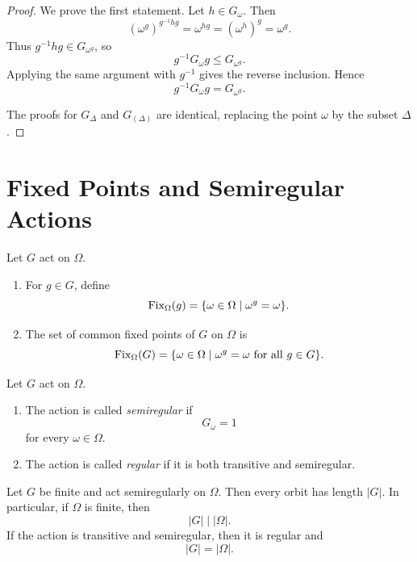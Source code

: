 \begin{proof}
We prove the first statement. Let \(h\in G_\omega\). Then
\[
    (\omega^g)^{g^{-1}hg}
    =
    \omega^{hg}
    =
    (\omega^h)^g
    =
    \omega^g.
\]
Thus \(g^{-1}hg\in G_{\omega^g}\), so
\[
    g^{-1}G_\omega g\leq G_{\omega^g}.
\]
Applying the same argument with \(g^{-1}\) gives the reverse inclusion. Hence
\[
    g^{-1}G_\omega g=G_{\omega^g}.
\]

The proofs for \(G_\Delta\) and \(G_{(\Delta)}\) are identical, replacing the point \(\omega\) by the subset \(\Delta\).
\end{proof}

\section{Fixed Points and Semiregular Actions}

\begin{definition}
Let \(G\) act on \(\Omega\).

\begin{enumerate}[label=\textup{(\arabic*)}]
    \item For \(g\in G\), define
    \[
        \operatorname{Fix}_\Omega(g)=\{\omega\in\Omega\mid \omega^g=\omega\}.
    \]

    \item The set of common fixed points of \(G\) on \(\Omega\) is
    \[
        \operatorname{Fix}_\Omega(G)
        =
        \{\omega\in\Omega\mid \omega^g=\omega \text{ for all } g\in G\}.
    \]
\end{enumerate}
\end{definition}

\begin{definition}
Let \(G\) act on \(\Omega\).

\begin{enumerate}[label=\textup{(\arabic*)}]
    \item The action is called \emph{semiregular} if
    \[
        G_\omega=1
    \]
    for every \(\omega\in\Omega\).

    \item The action is called \emph{regular} if it is both transitive and semiregular.
\end{enumerate}
\end{definition}

\begin{proposition}
Let \(G\) be finite and act semiregularly on \(\Omega\). Then every orbit has length \(|G|\). In particular, if \(\Omega\) is finite, then
\[
    |G|\mid |\Omega|.
\]
If the action is transitive and semiregular, then it is regular and
\[
    |G|=|\Omega|.
\]
\end{proposition}

